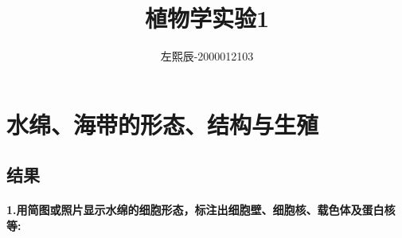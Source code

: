 \documentclass[UTF8]{ctexart}
\author{左熙辰-2000012103}
\date{}
\title{植物学实验1}
\begin{document}
    \maketitle
    \section{水绵、海带的形态、结构与生殖}
        \subsection*{结果}
            \paragraph*{1.用简图或照片显示水绵的细胞形态，标注出细胞壁、细胞核、载色体及蛋白核等:}
            \begin{figure}[h]
                \centering

\end{figure}
\end{document}
